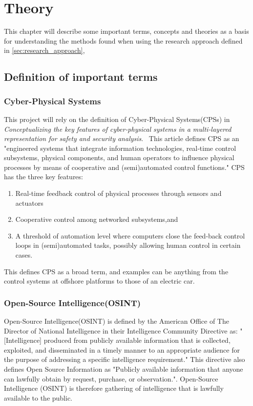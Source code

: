 \section{Theory} \label{sec:theory}
This chapter will describe some important terms, concepts and theories as a basis for understanding the methods found when using the research approach defined in \cref{sec:research_approach}, 

\subsection{Definition of important terms} \label{sec:definitions}
\subsubsection{Cyber-Physical Systems}\label{sec:cps}
This project will rely on the definition of Cyber-Physical Systems(CPSs) in \textit{Conceptualizing the key features of cyber‐physical systems in a multi‐layered representation for safety and security analysis}.~\cite{guzman_wied_kozine_lundteigen_2019}
This article defines CPS as an "engineered systems that integrate information technologies, real‐time control subsystems, physical components, and human operators to influence physical processes by means of cooperative and (semi)automated control functions." CPS has the three key features:
\begin{enumerate}
    \item Real-time feedback control of physical processes through sensors and actuators  
    \item Cooperative control among networked subsystems,and
    \item A threshold of automation level where computers close the feed-back control loops in (semi)automated tasks, possibly allowing human control in certain cases. 
\end{enumerate}
This defines CPS as a broad term, and examples can be anything from the control systems at offshore platforms to those of an electric car. 

\subsubsection{Open-Source Intelligence(OSINT)}\label{sec:osint}
Open-Source Intelligence(OSINT) is defined by the American Office of The Director of National Intelligence in their Intelligence Community Directive as: "[Intelligence] produced from publicly available information that is collected, exploited, and disseminated in a timely manner to an appropriate audience for the purpose of addressing a specific intelligence requirement."\cite{directive_301} This directive also defines Open Source Information as "Publicly available information that anyone can lawfully obtain by request, purchase, or observation.". Open-Source Intelligence (OSINT) is therefore gathering of intelligence that is lawfully available to the public. 

